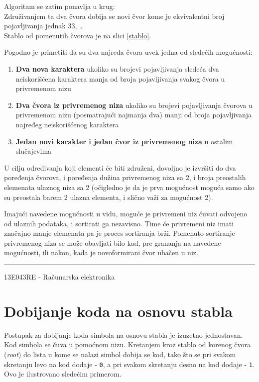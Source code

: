 \documentclass[a4paper, 12pt]{article}
\newcommand{\btmline}{
\vfill
\rule{0.9\textwidth}{0.4mm}
\begin{center}
13E043RE - Računarska elektronika
\end{center}}
\begin{document}
Algoritam se zatim ponavlja u krug: \\
Združivanjem ta dva čvora dobija se novi čvor kome je ekvivalentni broj pojavljivanja jednak $33$, \ldots \\
Stablo od pomenutih čvorova je na slici \ref{stablo}.

Pogodno je primetiti da su dva najređa čvora uvek jedna od sledećih mogućnosti:
\begin{enumerate}
	\item \textbf{Dva nova karaktera} ukoliko su brojevi pojavljivanja sledeća dva neiskorišćena karaktera manja od broja pojavljivanja svakog čvora u privremenom nizu
	\item \textbf{Dva čvora iz privremenog niza} ukoliko su brojevi pojavljivanja čvorova u privremenom nizu (posmatrajući najmanja dva) manji od broja pojavljivanja najređeg neiskorišćenog karaktera
	\item \textbf{Jedan novi karakter i jedan čvor iz privremenog niza} u ostalim slučajevima
\end{enumerate}

U cilju određivanja koji elementi će biti združeni, dovoljno je izvršiti do dva poređenja čvorova, i poređenja dužina privremenog niza sa 2, i broja preostalih elemenata ulaznog niza sa 2 (očigledno je da je prva mogućnost moguća samo ako su preostala barem 2 ulazna elementa, i slično važi za mogućnost 2).

Imajući navedene mogućnosti u vidu, moguće je privremeni niz čuvati odvojeno od ulaznih podataka, i sortirati ga nezavisno. Time će privremeni niz imati značajno manje elemenata pa je proces sortiranja brži. Pomenuto sortiranje privremenog niza se može obavljati bilo kad, pre grananja na navedene mogućnosti, ili nakon, kada je novoformirani čvor ubačen u niz.


\btmline\newpage

\section*{Dobijanje koda na osnovu stabla}

Postupak za dobijanje koda simbola na osnovu stabla je izuzetno jednostavan. Kod simbola se čuva u pomoćnom nizu. Kretanjem kroz stablo od korenog čvora (\textit{root}) do lista u kome se nalazi simbol dobija se kod, tako što se pri svakom skretanju levo na kod dodaje - \verb|0|, a pri svakom skretanju desno na kod dodaje - \verb|1|. Ovo je ilustrovano sledećim primerom.
\end{document}
